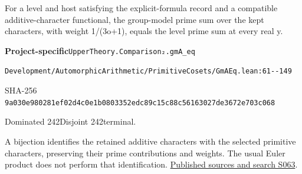 
\begin{formalstatement}[D547]\label{decomp:D547}
For a level and host satisfying the explicit-formula record and a compatible additive-character functional, the group-model prime sum over the kept characters, with weight 1/(3o+1), equals the level prime sum at every real y.
\end{formalstatement}
{\small\raggedright\noindent\textsf{\bfseries Project-specific}\quad \nolinkurl{UpperTheory.Comparison₂.gmA_eq}\par\noindent \nolinkurl{Development/AutomorphicArithmetic/PrimitiveCosets/GmAEq.lean:61--149}\par\noindent SHA-256 \nolinkurl{9a030e980281ef02d4c0e1b0803352edc89c15c88c56163027de3672e703c068}\par\noindent Dominated 242\quad Disjoint 242\quad terminal.\par}
A bijection identifies the retained additive characters with the selected primitive characters, preserving their prime contributions and weights. The usual Euler product does not perform that identification.
\hyperref[lit:S063]{Published sources and search S063}.
